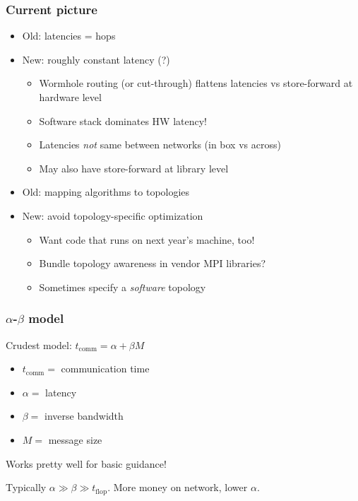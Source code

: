 \documentclass{beamer}
\begin{document}
\begin{frame}
  \frametitle{Current picture}

  \begin{itemize}
  \item Old: latencies = hops
  \item New: roughly constant latency (?)
    \begin{itemize}
    \item Wormhole routing (or cut-through) flattens latencies
      vs store-forward at hardware level
    \item Software stack dominates HW latency!
    \item Latencies {\em not} same between networks (in box vs across)
    \item May also have store-forward at library level
    \end{itemize}
 \vspace{2mm}
  \item Old: mapping algorithms to topologies
  \item New: avoid topology-specific optimization
    \begin{itemize}
    \item Want code that runs on next year's machine, too!
    \item Bundle topology awareness in vendor MPI libraries?
    \item Sometimes specify a {\em software} topology
    \end{itemize}
  \end{itemize}

\end{frame}


\begin{frame}
  \frametitle{$\alpha$-$\beta$ model}

  Crudest model: $t_{\mathrm{comm}} = \alpha + \beta M$
  \begin{itemize}
  \item $t_{\mathrm{comm}} = $ communication time
  \item $\alpha = $ latency
  \item $\beta = $ inverse bandwidth
  \item $M = $ message size
  \end{itemize}
  Works pretty well for basic guidance!

  \vspace{5mm}
  Typically $\alpha \gg \beta \gg t_{\mathrm{flop}}$.
  More money on network, lower $\alpha$.
\end{frame}
\end{document}
